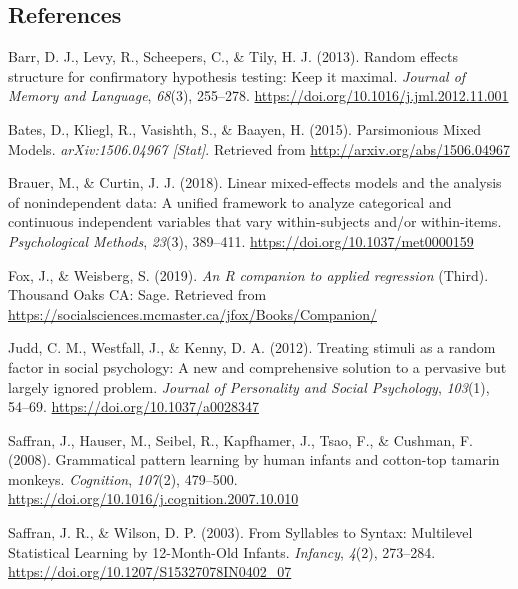 \documentclass[english,man,man,floatsintext]{apa6}
\begin{document}
\begin{appendix}
\hypertarget{references}{%
\subsection*{References}\label{references}}

\begingroup
\setlength{\parindent}{-0.5in}
\setlength{\leftskip}{0.5in}

\hypertarget{refs}{}
\leavevmode\hypertarget{ref-barr2013}{}%
Barr, D. J., Levy, R., Scheepers, C., \& Tily, H. J. (2013). Random
effects structure for confirmatory hypothesis testing: Keep it maximal.
\emph{Journal of Memory and Language}, \emph{68}(3), 255--278.
\url{https://doi.org/10.1016/j.jml.2012.11.001}

\leavevmode\hypertarget{ref-bates2015a}{}%
Bates, D., Kliegl, R., Vasishth, S., \& Baayen, H. (2015). Parsimonious
Mixed Models. \emph{arXiv:1506.04967 {[}Stat{]}}. Retrieved from
\url{http://arxiv.org/abs/1506.04967}

\leavevmode\hypertarget{ref-brauer2018}{}%
Brauer, M., \& Curtin, J. J. (2018). Linear mixed-effects models and the
analysis of nonindependent data: A unified framework to analyze
categorical and continuous independent variables that vary
within-subjects and/or within-items. \emph{Psychological Methods},
\emph{23}(3), 389--411. \url{https://doi.org/10.1037/met0000159}

\leavevmode\hypertarget{ref-fox2019}{}%
Fox, J., \& Weisberg, S. (2019). \emph{An R companion to applied
regression} (Third). Thousand Oaks CA: Sage. Retrieved from
\url{https://socialsciences.mcmaster.ca/jfox/Books/Companion/}

\leavevmode\hypertarget{ref-judd2012}{}%
Judd, C. M., Westfall, J., \& Kenny, D. A. (2012). Treating stimuli as a
random factor in social psychology: A new and comprehensive solution to
a pervasive but largely ignored problem. \emph{Journal of Personality
and Social Psychology}, \emph{103}(1), 54--69.
\url{https://doi.org/10.1037/a0028347}

\leavevmode\hypertarget{ref-saffran2008}{}%
Saffran, J., Hauser, M., Seibel, R., Kapfhamer, J., Tsao, F., \&
Cushman, F. (2008). Grammatical pattern learning by human infants and
cotton-top tamarin monkeys. \emph{Cognition}, \emph{107}(2), 479--500.
\url{https://doi.org/10.1016/j.cognition.2007.10.010}

\leavevmode\hypertarget{ref-saffran2003}{}%
Saffran, J. R., \& Wilson, D. P. (2003). From Syllables to Syntax:
Multilevel Statistical Learning by 12-Month-Old Infants. \emph{Infancy},
\emph{4}(2), 273--284. \url{https://doi.org/10.1207/S15327078IN0402_07}


\end{appendix}
\end{document}
